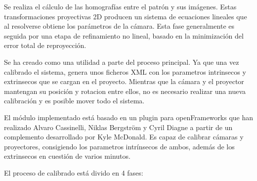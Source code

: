 Se realiza el cálculo de las homografías entre el patrón y sus imágenes. Estas transformaciones proyectivas 2D producen un sistema de ecuaciones lineales que al resolverse obtiene los parámetros de la cámara. Esta fase generalmente es seguida por una etapa de refinamiento no lineal, basado en la minimización del error total de reproyección.

Se ha creado como una utilidad a parte del proceso principal. Ya que una vez calibrado el sistema, genera unos ficheros XML con los parametros intrinsecos y extrinsecos que se cargan en el proyecto. Mientras que la cámara y el proyector mantengan su posición y rotacion entre ellos, no es necesario realizar una nueva calibración y es posible mover todo el sistema.

El módulo implementado está basado en un plugin para openFrameworks que han realizado Alvaro Cassinelli, Niklas Bergström y Cyril Diagne a partir de un complemento desarrollado por Kyle McDonald. Es capaz de calibrar cámaras y proyectores, consigiendo los parametros intrínsecos de ambos, además de los extrinsecos en cuestión de varios minutos. 

El proceso de calibrado está divido en 4 fases:

